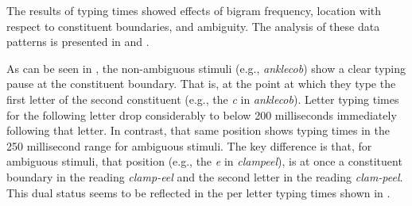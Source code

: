 \documentclass[output=paper]{langsci/langscibook}
\begin{document}
The results of typing times showed effects of bigram frequency, location with respect to constituent boundaries, and ambiguity.  The analysis of these data patterns is presented in  and . 

As can be seen in , the non-ambiguous stimuli (e.g., \textit{anklecob}) show a clear typing pause at the constituent boundary. That is, at the point at which they type the first letter of the second constituent (e.g., the \textit{c} in \textit{anklecob}). Letter typing times for the following letter drop considerably to below 200 milliseconds immediately following that letter. In contrast, that same position shows typing times in the 250 millisecond range for ambiguous stimuli. The key difference is that, for ambiguous stimuli, that position (e.g., the \textit{e} in \textit{clampeel}), is at once a constituent boundary in the reading \textit{clamp-eel} and the second letter in the reading \textit{clam-peel}. This dual status seems to be reflected in the per letter typing times shown in . 
\end{document}
